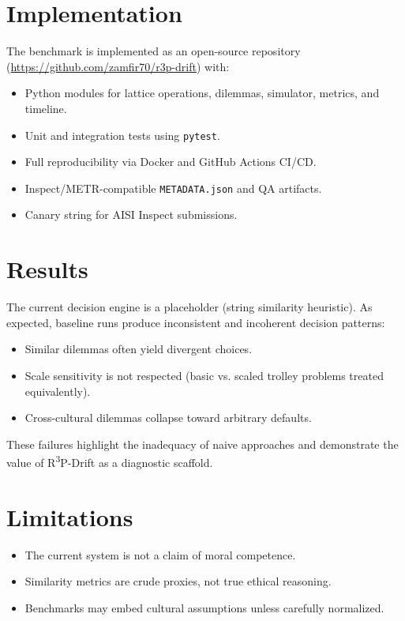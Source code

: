 \documentclass{article}
\begin{document}
\section{Implementation}
The benchmark is implemented as an open-source repository (\url{https://github.com/zamfir70/r3p-drift}) with:
\begin{itemize}
    \item Python modules for lattice operations, dilemmas, simulator, metrics, and timeline.
    \item Unit and integration tests using \texttt{pytest}.
    \item Full reproducibility via Docker and GitHub Actions CI/CD.
    \item Inspect/METR-compatible \texttt{METADATA.json} and QA artifacts.
    \item Canary string for AISI Inspect submissions.
\end{itemize}

\section{Results}
The current decision engine is a placeholder (string similarity heuristic).
As expected, baseline runs produce inconsistent and incoherent decision patterns:
\begin{itemize}
    \item Similar dilemmas often yield divergent choices.
    \item Scale sensitivity is not respected (basic vs. scaled trolley problems treated equivalently).
    \item Cross-cultural dilemmas collapse toward arbitrary defaults.
\end{itemize}
These failures highlight the inadequacy of naive approaches and demonstrate the value of R\textsuperscript{3}P-Drift as a diagnostic scaffold.

\section{Limitations}
\begin{itemize}
    \item The current system is not a claim of moral competence.
    \item Similarity metrics are crude proxies, not true ethical reasoning.
    \item Benchmarks may embed cultural assumptions unless carefully normalized.
\end{itemize}
\end{document}
